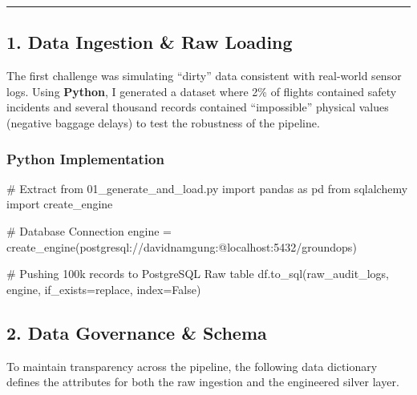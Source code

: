 \documentclass[
  letterpaper,
  DIV=11,
  numbers=noendperiod]{scrartcl}
\newenvironment{Shaded}{\begin{snugshade}}{\end{snugshade}}
\newcommand{\CommentTok}[1]{\textcolor[rgb]{0.37,0.37,0.37}{#1}}
\newcommand{\ImportTok}[1]{\textcolor[rgb]{0.00,0.46,0.62}{#1}}
\newcommand{\NormalTok}[1]{\textcolor[rgb]{0.00,0.23,0.31}{#1}}
\newcommand{\OperatorTok}[1]{\textcolor[rgb]{0.37,0.37,0.37}{#1}}
\newcommand{\StringTok}[1]{\textcolor[rgb]{0.13,0.47,0.30}{#1}}
\newcommand{\VariableTok}[1]{\textcolor[rgb]{0.07,0.07,0.07}{#1}}
\begin{document}
\begin{center}\rule{0.5\linewidth}{0.5pt}\end{center}

\subsection{1. Data Ingestion \& Raw
Loading}\label{data-ingestion-raw-loading}

The first challenge was simulating ``dirty'' data consistent with
real-world sensor logs. Using \textbf{Python}, I generated a dataset
where 2\% of flights contained safety incidents and several thousand
records contained ``impossible'' physical values (negative baggage
delays) to test the robustness of the pipeline.

\subsubsection{Python Implementation}

\begin{Shaded}
\begin{Highlighting}[]
\CommentTok{\# Extract from 01\_generate\_and\_load.py}
\ImportTok{import}\NormalTok{ pandas }\ImportTok{as}\NormalTok{ pd}
\ImportTok{from}\NormalTok{ sqlalchemy }\ImportTok{import}\NormalTok{ create\_engine}

\CommentTok{\# Database Connection}
\NormalTok{engine }\OperatorTok{=}\NormalTok{ create\_engine(}\StringTok{\textquotesingle{}postgresql://davidnamgung:@localhost:5432/groundops\textquotesingle{}}\NormalTok{)}

\CommentTok{\# Pushing 100k records to PostgreSQL \textquotesingle{}Raw\textquotesingle{} table}
\NormalTok{df.to\_sql(}\StringTok{\textquotesingle{}raw\_audit\_logs\textquotesingle{}}\NormalTok{, engine, if\_exists}\OperatorTok{=}\StringTok{\textquotesingle{}replace\textquotesingle{}}\NormalTok{, index}\OperatorTok{=}\VariableTok{False}\NormalTok{)}
\end{Highlighting}
\end{Shaded}

\subsection{2. Data Governance \& Schema}\label{data-governance-schema}

To maintain transparency across the pipeline, the following data
dictionary defines the attributes for both the raw ingestion and the
engineered silver layer.
\end{document}
